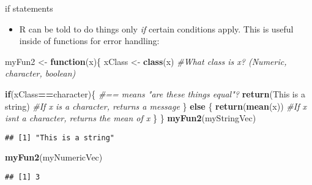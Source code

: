 \documentclass[
  ignorenonframetext,
  aspectratio=169]{beamer}
\newenvironment{Shaded}{\begin{snugshade}}{\end{snugshade}}
\newcommand{\CommentTok}[1]{\textcolor[rgb]{0.56,0.35,0.01}{\textit{#1}}}
\newcommand{\ControlFlowTok}[1]{\textcolor[rgb]{0.13,0.29,0.53}{\textbf{#1}}}
\newcommand{\FunctionTok}[1]{\textcolor[rgb]{0.13,0.29,0.53}{\textbf{#1}}}
\newcommand{\NormalTok}[1]{#1}
\newcommand{\OtherTok}[1]{\textcolor[rgb]{0.56,0.35,0.01}{#1}}
\newcommand{\SpecialCharTok}[1]{\textcolor[rgb]{0.81,0.36,0.00}{\textbf{#1}}}
\newcommand{\StringTok}[1]{\textcolor[rgb]{0.31,0.60,0.02}{#1}}
\providecommand{\tightlist}{%
  \setlength{\itemsep}{0pt}\setlength{\parskip}{0pt}}
\begin{document}
\begin{frame}[fragile]{if statements}
\protect\hypertarget{if-statements}{}
\begin{itemize}[<+->]
\tightlist
\item
  R can be told to do things only \emph{if} certain conditions apply.
  This is useful inside of functions for error handling:
\end{itemize}

\footnotesize

\begin{Shaded}
\begin{Highlighting}[]
\NormalTok{myFun2 }\OtherTok{\textless{}{-}} \ControlFlowTok{function}\NormalTok{(x)\{}
\NormalTok{  xClass }\OtherTok{\textless{}{-}} \FunctionTok{class}\NormalTok{(x) }\CommentTok{\#What class is x? (Numeric, character, boolean)}
  
  \ControlFlowTok{if}\NormalTok{(xClass}\SpecialCharTok{==}\StringTok{\textquotesingle{}character\textquotesingle{}}\NormalTok{)\{ }\CommentTok{\#== means "are these things equal"?}
    \FunctionTok{return}\NormalTok{(}\StringTok{\textquotesingle{}This is a string\textquotesingle{}}\NormalTok{) }\CommentTok{\#If x is a character, returns a message}
\NormalTok{  \} }\ControlFlowTok{else}\NormalTok{ \{}
    \FunctionTok{return}\NormalTok{(}\FunctionTok{mean}\NormalTok{(x)) }\CommentTok{\#If x isn\textquotesingle{}t a character, returns the mean of x}
\NormalTok{  \}}
\NormalTok{\}}
\FunctionTok{myFun2}\NormalTok{(myStringVec)}
\end{Highlighting}
\end{Shaded}

\begin{verbatim}
## [1] "This is a string"
\end{verbatim}

\begin{Shaded}
\begin{Highlighting}[]
\FunctionTok{myFun2}\NormalTok{(myNumericVec)}
\end{Highlighting}
\end{Shaded}

\begin{verbatim}
## [1] 3
\end{verbatim}

\normalsize
\end{frame}
\end{document}
